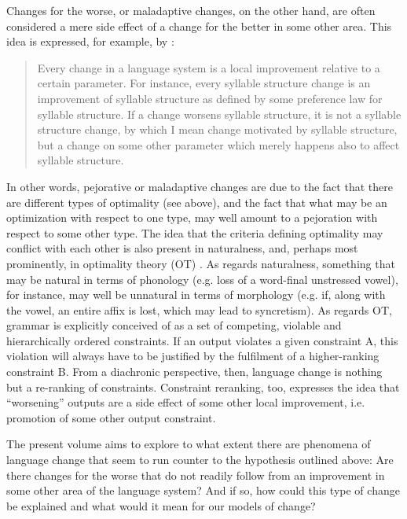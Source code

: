 \documentclass[output=paper,colorlinks,citecolor=brown]{langscibook}
\begin{document}
Changes for the worse, or maladaptive changes, on the other hand, are often considered a mere side effect of a change for the better in some other area. This idea is expressed, for example, by \citet{Vennemann_1988}:

\begin{quote}
Every change in a language system is a local improvement relative to a certain parameter. For instance, every syllable structure change is an improvement of syllable structure as defined by some preference law for syllable structure. If a change worsens syllable structure, it is not a syllable structure change, by which I mean change motivated by syllable structure, but a change on some other parameter which merely happens also to affect syllable structure. 
\citep[1-2]{Vennemann_1988}
\end{quote}

In other words, pejorative or maladaptive changes are due to the fact that there are different types of optimality (see \citealt[102]{Langacker_1977} above), and the fact that what may be an optimization with respect to one type, may well amount to a pejoration with respect to some other type. The idea that the criteria defining optimality may conflict with each other is also present in naturalness, and, perhaps most prominently, in optimality theory (OT) \citep{Prince_1993}. As regards naturalness, something that may be natural in terms of phonology (e.g. loss of a word-final unstressed vowel), for instance, may well be unnatural in terms of morphology (e.g. if, along with the vowel, an entire affix is lost, which may lead to syncretism). As regards OT, grammar is explicitly conceived of as a set of competing, violable and hierarchically ordered constraints. If an output violates a given constraint A, this violation will always have to be justified by the fulfilment of a higher-ranking constraint B. From a diachronic perspective, then, language change is nothing but a re-ranking of constraints. Constraint reranking, too, expresses the idea that ``worsening'' outputs are a side effect of some other local improvement, i.e. promotion of some other output constraint. 

The present volume aims to explore to what extent there are phenomena of language change that seem to run counter to the hypothesis outlined above: Are there changes for the worse that do not readily follow from an improvement in some other area of the language system? And if so, how could this type of change be explained and what would it mean for our models of change? 
\end{document}

